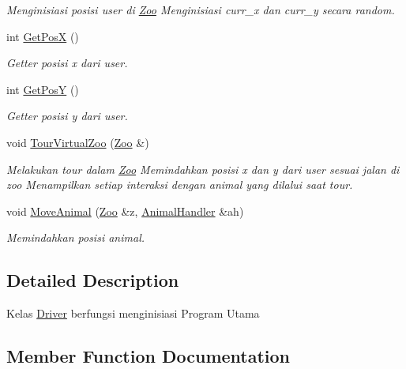 \begin{DoxyCompactItemize}
\begin{DoxyCompactList}\small\item\em Menginisiasi posisi user di \hyperlink{classZoo}{Zoo} Menginisiasi curr\+\_\+x dan curr\+\_\+y secara random. \end{DoxyCompactList}\item 
int \hyperlink{classDriver_a4538dcc6da88490c3585c1937b809737}{Get\+PosX} ()
\begin{DoxyCompactList}\small\item\em Getter posisi x dari user. \end{DoxyCompactList}\item 
int \hyperlink{classDriver_af299632638b6c848bd6b47d632541982}{Get\+PosY} ()
\begin{DoxyCompactList}\small\item\em Getter posisi y dari user. \end{DoxyCompactList}\item 
void \hyperlink{classDriver_acadd7e79ec4ed26eb390ff2821afbaea}{Tour\+Virtual\+Zoo} (\hyperlink{classZoo}{Zoo} \&)\hypertarget{classDriver_acadd7e79ec4ed26eb390ff2821afbaea}{}\label{classDriver_acadd7e79ec4ed26eb390ff2821afbaea}

\begin{DoxyCompactList}\small\item\em Melakukan tour dalam \hyperlink{classZoo}{Zoo} Memindahkan posisi x dan y dari user sesuai jalan di zoo Menampilkan setiap interaksi dengan animal yang dilalui saat tour. \end{DoxyCompactList}\item 
void \hyperlink{classDriver_a3a17437e65824c453001d5b16def3508}{Move\+Animal} (\hyperlink{classZoo}{Zoo} \&z, \hyperlink{classAnimalHandler}{Animal\+Handler} \&ah)
\begin{DoxyCompactList}\small\item\em Memindahkan posisi animal. \end{DoxyCompactList}\end{DoxyCompactItemize}


\subsection{Detailed Description}
Kelas \hyperlink{classDriver}{Driver} berfungsi menginisiasi Program Utama 

\subsection{Member Function Documentation}
